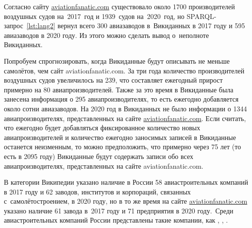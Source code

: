 Согласно сайту \href{https://www.aviationfanatic.com/}{aviationfanatic.com} 
существовало около \num{1700} производителей воздушных судов 
на~2017~год и 1939~судов на~2020~год\autocite{count_of_aircraft_manufactures}, 
но SPARQL-запрос~\ref{lst:lang2} вернул всего 300 авиазаводов в~Вики\-дан\-ных в 2017 году 
и 595 авиазаводов в 2020 году. Из этого можно сделать вывод о~неполноте Викиданных.  

Попробуем спрогнозировать, когда Викиданные будут описывать не меньше самолётов, 
чем сайт aviationfanatic.com. 
За три года количество производителей воздушных судов увеличилось на 239, 
что составляет ежегодный прирост примерно на 80 авиапроизводителей. 
Также за это время в Викиданные была занесена информация о 295 авиапроизводителях, 
то есть ежегодно добавляется около сотни авиазаводов. 
На 2020 год в Викиданных не было информации о \num{1344} авиапроизводителях, 
представленных на сайте \href{https://www.aviationfanatic.com/}{aviationfanatic.com}. 
Если считать, что ежегодно будет добавляться фиксированное количество новых авиапроизводителей 
и количество ежегодно заносимых записей в Викиданные останется неизменным, 
то можно предположить, что примерно через 75 лет (то есть в 2095 году) 
Викиданные будут содержать записи обо всех авиапроизводителях, представленных на сайте aviationfanatic.com.

В категории Википедии  указано наличие в России 58 авиастроительных компаний в 2017 году 
и 62 заводов, институтов и корпораций, связанных с~самолётостроением, в 2020 году, 
но в то же время на сайте \href{https://www.aviationfanatic.com/}{aviationfanatic.com} 
указано наличие 61 завода в~2017 году 
и 71 предприятия в 2020 году\autocite{count_plants_of_aircrafts}.\, 
Среди авиастроительных компаний России 
представлены такие компании, как , , .



